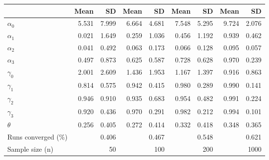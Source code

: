 
\begin{tabular}[t]{lrrrrrrrr}
\toprule
  & Mean & SD & Mean  & SD  & Mean   & SD   & Mean    & SD   \\
\midrule
$\alpha_{0}$ & 5.531 & 7.999 & 6.664 & 4.681 & 7.548 & 5.295 & 9.724 & 2.076\\
$\alpha_{1}$ & 0.021 & 1.649 & 0.259 & 1.036 & 0.456 & 1.192 & 0.939 & 0.462\\
$\alpha_{2}$ & 0.041 & 0.492 & 0.063 & 0.173 & 0.066 & 0.128 & 0.095 & 0.057\\
$\alpha_{3}$ & 0.497 & 0.873 & 0.625 & 0.587 & 0.728 & 0.628 & 0.970 & 0.239\\
$\gamma_{0}$ & 2.001 & 2.609 & 1.436 & 1.953 & 1.167 & 1.397 & 0.916 & 0.863\\
$\gamma_{1}$ & 0.814 & 0.575 & 0.942 & 0.415 & 0.980 & 0.289 & 0.990 & 0.141\\
$\gamma_{2}$ & 0.946 & 0.910 & 0.935 & 0.683 & 0.954 & 0.482 & 0.991 & 0.224\\
$\gamma_{3}$ & 0.920 & 0.436 & 0.970 & 0.291 & 0.982 & 0.212 & 0.994 & 0.101\\
$\theta$ & 0.256 & 0.405 & 0.272 & 0.414 & 0.332 & 0.418 & 0.348 & 0.365\\
Runs converged (\%) &  & 0.406 &  & 0.467 &  & 0.548 &  & 0.621\\
Sample size (n) &  & 50 &  & 100 &  & 200 &  & 1000\\
\bottomrule
\end{tabular}
